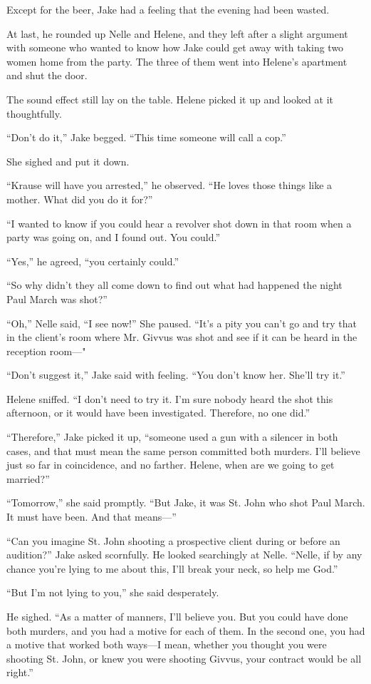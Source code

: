 \documentclass{novel}
\begin{document}
Except for the beer, Jake had a feeling that the evening had been wasted.

At last, he rounded up Nelle and Helene, and they left after a slight argument with someone who wanted to know how Jake could get away with taking two women home from the party. The three of them went into Helene’s apartment and shut the door.

The sound effect still lay on the table. Helene picked it up and looked at it thoughtfully.

“Don’t do it,” Jake begged. “This time someone will call a cop.”

She sighed and put it down.

“Krause will have you arrested,” he observed. “He loves those things like a mother. What did you do it for?”

“I wanted to know if you could hear a revolver shot down in that room when a party was going on, and I found out. You could.”

“Yes,” he agreed, “you certainly could.”

“So why didn’t they all come down to find out what had happened the night Paul March was shot?”

“Oh,” Nelle said, “I see now!” She paused. “It’s a pity you can’t go and try that in the client’s room where Mr. Givvus was shot and see if it can be heard in the reception room—"

“Don’t suggest it,” Jake said with feeling. “You don’t know her. She’ll try it.”

Helene sniffed. “I don’t need to try it. I’m sure nobody heard the shot this afternoon, or it would have been investigated. Therefore, no one did.”

“Therefore,” Jake picked it up, “someone used a gun with a silencer in both cases, and that must mean the same person committed both murders. I’ll believe just so far in coincidence, and no farther. Helene, when are we going to get married?”

“Tomorrow,” she said promptly. “But Jake, it was St. John who shot Paul March. It must have been. And that means—”

“Can you imagine St. John shooting a prospective client during or before an audition?” Jake asked scornfully. He looked searchingly at Nelle. “Nelle, if by any chance you’re lying to me about this, I’ll break your neck, so help me God.”

“But I’m not lying to you,” she said desperately.

He sighed. “As a matter of manners, I’ll believe you. But you could have done both murders, and you had a motive for each of them. In the second one, you had a motive that worked both ways—I mean, whether you thought you were shooting St. John, or knew you were shooting Givvus, your contract would be all right.”
\end{document}
